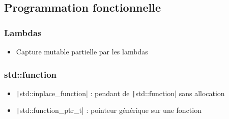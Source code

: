 \documentclass[C++.tex]{subfiles}
\begin{document}
\subsection*{Programmation fonctionnelle}
\begin{frame}[fragile]
	\frametitle{Lambdas}
	\begin{itemize}
		\item Capture mutable partielle par les lambdas

	\end{itemize}
\end{frame}

\begin{frame}[fragile]
	\frametitle{{\NoAutoSpacing std::function}}
	\begin{itemize}
		\item \texttt|std::inplace_function| : pendant de \texttt|std::function| sans allocation


		\item \texttt|std::function_ptr_t| : pointeur générique sur une fonction
	\end{itemize}
\end{frame}
\end{document}
